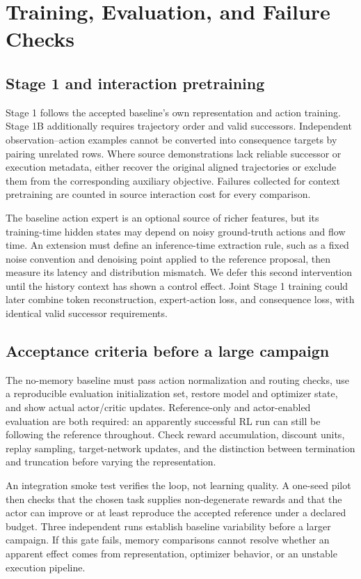 \documentclass[10pt,letterpaper]{article}
\begin{document}
\section{Training, Evaluation, and Failure Checks}
\label{app:checks}
\subsection{Stage 1 and interaction pretraining}
Stage 1 follows the accepted baseline's own representation and action training. Stage 1B additionally requires trajectory order and valid successors. Independent observation--action examples cannot be converted into consequence targets by pairing unrelated rows. Where source demonstrations lack reliable successor or execution metadata, either recover the original aligned trajectories or exclude them from the corresponding auxiliary objective. Failures collected for context pretraining are counted in source interaction cost for every comparison.

The baseline action expert is an optional source of richer features, but its training-time hidden states may depend on noisy ground-truth actions and flow time. An extension must define an inference-time extraction rule, such as a fixed noise convention and denoising point applied to the reference proposal, then measure its latency and distribution mismatch. We defer this second intervention until the history context has shown a control effect. Joint Stage 1 training could later combine token reconstruction, expert-action loss, and consequence loss, with identical valid successor requirements.

\subsection{Acceptance criteria before a large campaign}
The no-memory baseline must pass action normalization and routing checks, use a reproducible evaluation initialization set, restore model and optimizer state, and show actual actor/critic updates. Reference-only and actor-enabled evaluation are both required: an apparently successful RL run can still be following the reference throughout. Check reward accumulation, discount units, replay sampling, target-network updates, and the distinction between termination and truncation before varying the representation.

An integration smoke test verifies the loop, not learning quality. A one-seed pilot then checks that the chosen task supplies non-degenerate rewards and that the actor can improve or at least reproduce the accepted reference under a declared budget. Three independent runs establish baseline variability before a larger campaign. If this gate fails, memory comparisons cannot resolve whether an apparent effect comes from representation, optimizer behavior, or an unstable execution pipeline.
\end{document}
